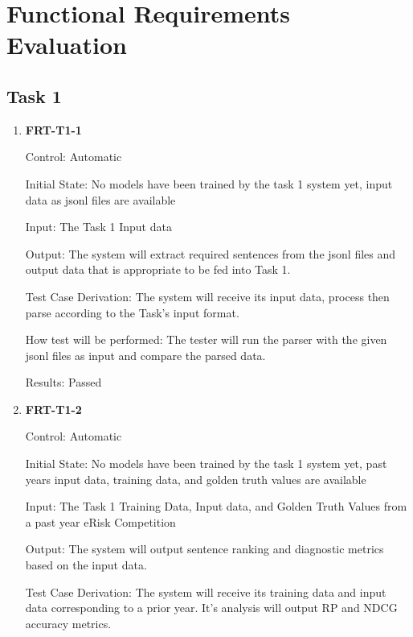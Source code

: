\documentclass[12pt, titlepage]{article}
\begin{document}
\newpage

\tableofcontents

\listoftables %

\listoffigures %

\newpage



\section{Functional Requirements Evaluation}
\subsection{Task 1}

\begin{enumerate}
\item \textbf{FRT-T1-1}

Control: Automatic

Initial State: No models have been trained by the task 1 system yet, input data as jsonl files are available

Input: The Task 1 Input data

Output: The system will extract required sentences from the jsonl files and output data that is appropriate to be fed into Task 1.

Test Case Derivation: The system will receive its input data, process then parse according to the Task's input format.

How test will be performed: The tester will run the parser with the given jsonl files as input and compare the parsed data.

Results: Passed

\item \textbf{FRT-T1-2}

Control: Automatic

Initial State: No models have been trained by the task 1 system yet, past years input data, training data, and golden truth values are available

Input: The Task 1 Training Data, Input data, and Golden Truth Values from a past year eRisk Competition

Output: The system will output sentence ranking and diagnostic metrics based on the input data. 

Test Case Derivation: The system will receive its training data and input data corresponding to a prior year. It's analysis will output RP and NDCG accuracy metrics.


\end{enumerate}
\end{document}
